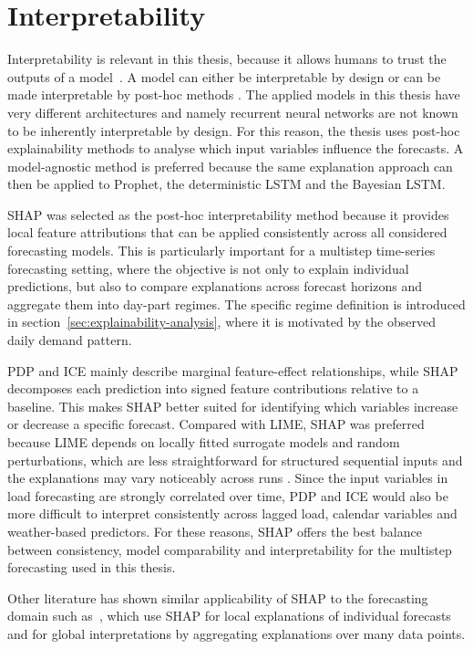 \documentclass[Master,english,IEEE]{twbook}
\begin{document}
\section{Interpretability}

Interpretability is relevant in this thesis, because it allows humans to trust the outputs of a model~\cite{InterpretableMachineLearning}. A model can either be interpretable by design or can be made interpretable by post-hoc methods \cite{baurExplainabilityInterpretabilityElectric2024}. The applied models in this thesis have very different architectures and namely recurrent neural networks are not known to be inherently interpretable by design. For this reason, the thesis uses post-hoc explainability methods to analyse which input variables influence the forecasts. A model-agnostic method is preferred because the same explanation approach can then be applied to Prophet, the deterministic LSTM and the Bayesian LSTM.

SHAP was selected as the post-hoc interpretability method because it provides local feature attributions that can be applied consistently across all considered forecasting models. This is particularly important for a multistep time-series forecasting setting, where the objective is not only to explain individual predictions, but also to compare explanations across forecast horizons and aggregate them into day-part regimes. The specific regime definition is introduced in section~\ref{sec:explainability-analysis}, where it is motivated by the observed daily demand pattern.

PDP and ICE mainly describe marginal feature-effect relationships, while SHAP decomposes each prediction into signed feature contributions relative to a baseline. This makes SHAP better suited for identifying which variables increase or decrease a specific forecast. Compared with LIME, SHAP was preferred because LIME depends on locally fitted surrogate models and random perturbations, which are less straightforward for structured sequential inputs and the explanations may vary noticeably across runs \cite{InterpretableMachineLearning}. Since the input variables in load forecasting are strongly correlated over time, PDP and ICE would also be more difficult to interpret consistently across lagged load, calendar variables and weather-based predictors. For these reasons, SHAP offers the best balance between consistency, model comparability and interpretability for the multistep forecasting used in this thesis.

Other literature has shown similar applicability of SHAP to the forecasting domain such as~\cite{chakrabortyScenariobasedPredictionClimate2021, mitrentsisInterpretableProbabilisticModel2022}, which use SHAP for local explanations of individual forecasts and for global interpretations by aggregating explanations over many data points.
\end{document}
